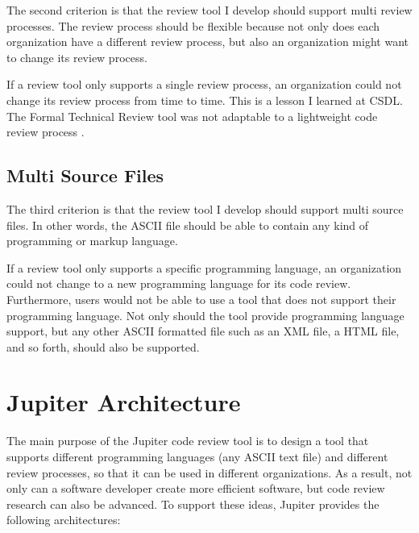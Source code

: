 The second criterion is that the review tool I develop should support multi review processes. The review process should be flexible because not only does each organization have a different review process, but also an organization might want to change its review process.

If a review tool only supports a single review process, an organization could not change its review process from time to time. This is a lesson I learned at CSDL. The Formal Technical Review tool was not adaptable to a lightweight code review process \cite{wiegers:seven}.

\subsection{Multi Source Files}
\label{subsec:multi-source-files}

The third criterion is that the review tool I develop should support multi source files. In other words, the ASCII file should be able to contain any kind of programming or markup language.

If a review tool only supports a specific programming language, an organization could not change to a new programming language for its code review. Furthermore, users would not be able to use a tool that does not support their programming language. Not only should the tool provide programming language support, but any other ASCII formatted file such as an XML file, a HTML file, and so forth, should also be supported.

\section{Jupiter Architecture}
\label{sec:jupiter-architecture}

The main purpose of the Jupiter code review tool is to design a tool that supports different programming languages (any ASCII text file) and different review processes, so that it can be used in different organizations. As a result, not only can a software developer create more efficient software, but code review research can also be advanced. To support these ideas, Jupiter provides the following architectures:

